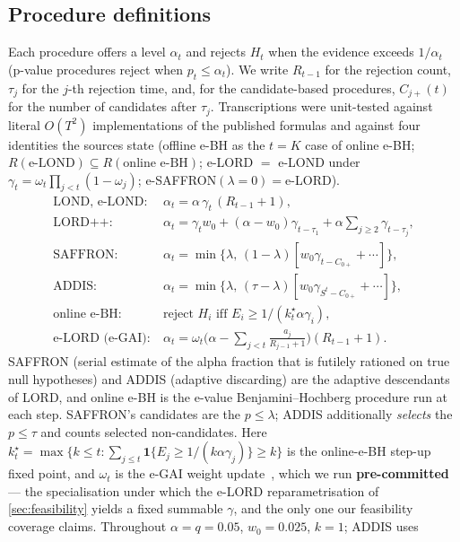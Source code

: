 \documentclass[conference]{IEEEtran}
\newcommand{\alphat}{\alpha_t}
\begin{document}
\FloatBarrier
\subsection{Procedure definitions}

Each procedure offers a level $\alphat$ and rejects $H_t$ when the evidence exceeds $1/\alphat$
(p-value procedures reject when $p_t\le\alphat$). We write $R_{t-1}$ for the rejection count, $\tau_j$
for the $j$-th rejection time, and, for the candidate-based procedures, $C_{j+}(t)$ for the number of
candidates after $\tau_j$. Transcriptions were unit-tested against literal $O(T^2)$ implementations of
the published formulas and against four identities the sources state (offline e-BH as the $t=K$ case of
online e-BH; $R(\text{e-LOND})\subseteq R(\text{online e-BH})$; e-LORD $=$ e-LOND under
$\gamma_t=\omega_t\prod_{j<t}(1-\omega_j)$; e-SAFFRON$(\lambda{=}0)=$e-LORD).
{\small\begin{align*}
\text{LOND, e-LOND:}\ &\alphat=\alpha\,\gamma_t\,(R_{t-1}+1),\\
\text{LORD++:}\ &\alphat=\gamma_t w_0+(\alpha-w_0)\gamma_{t-\tau_1}+\alpha\!\sum_{j\ge2}\gamma_{t-\tau_j},\\
\text{SAFFRON:}\ &\alphat=\min\big\{\lambda,\,(1-\lambda)[w_0\gamma_{t-C_{0+}}+\cdots]\big\},\\
\text{ADDIS:}\ &\alphat=\min\big\{\lambda,\,(\tau-\lambda)[w_0\gamma_{S^t-C_{0+}}+\cdots]\big\},\\
\text{online e-BH:}\ &\text{reject } H_i \text{ iff } E_i\ge 1/(k^\star_t\alpha\gamma_i),\\
\text{e-LORD (e-GAI):}\ &\alphat=\omega_t\big(\alpha-\textstyle\sum_{j<t}\tfrac{a_j}{R_{j-1}+1}\big)(R_{t-1}+1).
\end{align*}}%
SAFFRON (serial estimate of the alpha fraction that is futilely rationed on true null hypotheses) and
ADDIS (adaptive discarding) are the adaptive descendants of LORD, and online e-BH is the e-value
Benjamini--Hochberg procedure run at each step. SAFFRON's candidates are the $p\le\lambda$; ADDIS additionally \emph{selects} the $p\le\tau$ and counts
selected non-candidates. Here $k^\star_t=\max\{k\le t:\sum_{j\le t}\mathbf{1}\{E_j\ge
1/(k\alpha\gamma_j)\}\ge k\}$ is the online-e-BH step-up fixed point, and $\omega_t$ is the e-GAI weight
update~\cite{egai2025}, which we run \textbf{pre-committed} --- the specialisation under which the
e-LORD reparametrisation of \cref{sec:feasibility} yields a fixed summable $\gamma$, and the only one
our feasibility coverage claims. Throughout $\alpha=q=0.05$, $w_0=0.025$, $k=1$; ADDIS uses
\end{document}
